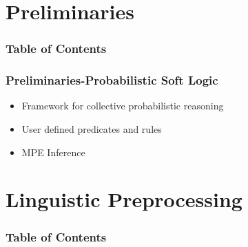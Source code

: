 \documentclass[red]{beamer}
\begin{document}
\section{Preliminaries}
\begin{frame}
\frametitle{Table of Contents}
\tableofcontents[currentsection]
\end{frame}
\begin{frame}
\frametitle{Preliminaries-Probabilistic Soft Logic}
    \begin{itemize}
        \item
            Framework for collective probabilistic reasoning
        \item
            User defined predicates and rules
        \item
            MPE Inference
    \end{itemize}
\end{frame}

\section{Linguistic Preprocessing}
\begin{frame}
\frametitle{Table of Contents}
\tableofcontents[currentsection]
\end{frame}
\end{document}
